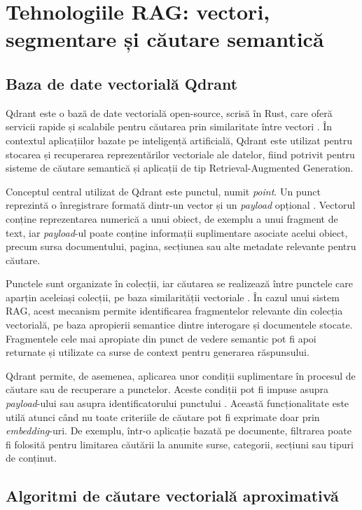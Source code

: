 \documentclass[12pt, a4paper, oneside, romanian]{teza-upb}
\begin{document}
\section{Tehnologiile RAG: vectori, segmentare și căutare semantică}

\subsection{Baza de date vectorială Qdrant}
Qdrant este o bază de date vectorială open-source, scrisă în Rust, care oferă servicii rapide și scalabile pentru căutarea prin similaritate între vectori \cite{qdrant_doc}. În contextul aplicațiilor bazate pe inteligență artificială, Qdrant este utilizat pentru stocarea și recuperarea reprezentărilor vectoriale ale datelor, fiind potrivit pentru sisteme de căutare semantică și aplicații de tip Retrieval-Augmented Generation.

Conceptul central utilizat de Qdrant este punctul, numit \textit{point}. Un punct reprezintă o înregistrare formată dintr-un vector și un \textit{payload} opțional \cite{qdrant_points}. Vectorul conține reprezentarea numerică a unui obiect, de exemplu a unui fragment de text, iar \textit{payload}-ul poate conține informații suplimentare asociate acelui obiect, precum sursa documentului, pagina, secțiunea sau alte metadate relevante pentru căutare.

Punctele sunt organizate în colecții, iar căutarea se realizează între punctele care aparțin aceleiași colecții, pe baza similarității vectoriale \cite{qdrant_points}. În cazul unui sistem RAG, acest mecanism permite identificarea fragmentelor relevante din colecția vectorială, pe baza apropierii semantice dintre interogare și documentele stocate. Fragmentele cele mai apropiate din punct de vedere semantic pot fi apoi returnate și utilizate ca surse de context pentru generarea răspunsului.

Qdrant permite, de asemenea, aplicarea unor condiții suplimentare în procesul de căutare sau de recuperare a punctelor. Aceste condiții pot fi impuse asupra \textit{payload}-ului sau asupra identificatorului punctului \cite{qdrant_filtering}. Această funcționalitate este utilă atunci când nu toate criteriile de căutare pot fi exprimate doar prin \textit{embedding}-uri. De exemplu, într-o aplicație bazată pe documente, filtrarea poate fi folosită pentru limitarea căutării la anumite surse, categorii, secțiuni sau tipuri de conținut.



\subsection{Algoritmi de căutare vectorială aproximativă}
\end{document}
